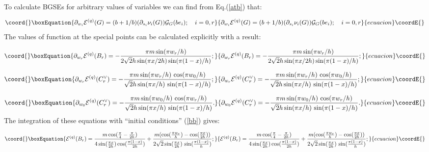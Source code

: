 \documentclass[a4paper,12pt,titlepage,final]{article}
\begin{document}
To calculate BGSEs for arbitrary values of variables \coordHE{} we can
find from Eq.(\ref{atb}) that:

\begin{equation}\coord{}\boxEquation{
\partial _{w_{i}}\mathcal{E}^{(q)}(G)=(b+1/b)(\partial _{s_{i}}\nu _{i}(G))
\mathcal{G}_{G}(be_{i});\quad i=0,r  \label{qbe}
}{
\partial _{w_{i}}\mathcal{E}^{(q)}(G)=(b+1/b)(\partial _{s_{i}}\nu _{i}(G))
\mathcal{G}_{G}(be_{i});\quad i=0,r  }{ecuacion}\coordE{}\end{equation}
The values of function \coordHE{} at the special points \coordHE{}
can be calculated explicitly with a result:

\begin{equation}\coord{}\boxEquation{
\partial _{w_{r}}\mathcal{E}^{(q)}(B_{r})=-\frac{\pi m\sin (\pi w_{r}/h)}
{2\sqrt{2}h\sin (\pi x/2h)\sin (\pi (1-x)/h)};  \label{wrb}
}{
\partial _{w_{r}}\mathcal{E}^{(q)}(B_{r})=-\frac{\pi m\sin (\pi w_{r}/h)}
{2\sqrt{2}h\sin (\pi x/2h)\sin (\pi (1-x)/h)};  }{ecuacion}\coordE{}\end{equation}

\begin{equation}\coord{}\boxEquation{
\partial _{w_{r}}\mathcal{E}^{(q)}(C_{r}^{\vee })=-\frac{\pi m\sin (\pi
w_{r}/h)\,\cos (\pi w_{0}/h)}{\sqrt{2}h\sin (\pi x/h)\,\sin (\pi (1-x)/h)};
\label{wr}
}{
\partial _{w_{r}}\mathcal{E}^{(q)}(C_{r}^{\vee })=-\frac{\pi m\sin (\pi
w_{r}/h)\,\cos (\pi w_{0}/h)}{\sqrt{2}h\sin (\pi x/h)\,\sin (\pi (1-x)/h)};
}{ecuacion}\coordE{}\end{equation}

\begin{equation}\coord{}\boxEquation{
\partial _{w_{0}}\mathcal{E}^{(q)}(C_{r}^{\vee })=-\frac{\pi m\sin (\pi
w_{0}/h)\,\cos (\pi w_{r}/h)}{\sqrt{2}h\sin (\pi x/h)\,\sin (\pi (1-x)/h)}.
\label{w0}
}{
\partial _{w_{0}}\mathcal{E}^{(q)}(C_{r}^{\vee })=-\frac{\pi m\sin (\pi
w_{0}/h)\,\cos (\pi w_{r}/h)}{\sqrt{2}h\sin (\pi x/h)\,\sin (\pi (1-x)/h)}.
}{ecuacion}\coordE{}\end{equation}
The integration of these equations with ``initial conditions'' (\ref{bb})
gives:

\begin{equation}\coord{}\boxEquation{
\mathcal{E}^{(q)}(B_{r})=\frac{m\cos (\frac{\pi }{4}-\frac{\pi }{2h})}{4\sin
(\frac{\pi x}{2h})\cos (\frac{\pi (1-x)}{2h})}+
\frac{m(\cos (\frac{\pi w_{r}}{h})-
\cos (\frac{\pi x}{2h}))}{2\sqrt{2}\sin (\frac{\pi x}{2h})
\,\sin (\frac{\pi (1-x)}{h})};  \label{e}
}{
\mathcal{E}^{(q)}(B_{r})=\frac{m\cos (\frac{\pi }{4}-\frac{\pi }{2h})}{4\sin
(\frac{\pi x}{2h})\cos (\frac{\pi (1-x)}{2h})}+
\frac{m(\cos (\frac{\pi w_{r}}{h})-
\cos (\frac{\pi x}{2h}))}{2\sqrt{2}\sin (\frac{\pi x}{2h})
\,\sin (\frac{\pi (1-x)}{h})};  }{ecuacion}\coordE{}\end{equation}
\end{document}
